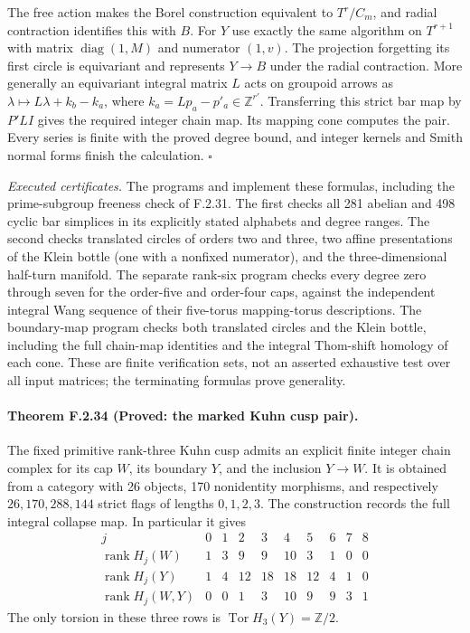 The free action makes the Borel construction equivalent to
$T^r/C_m$, and radial contraction identifies this with $B$.
For $Y$ use exactly the same algorithm on $T^{r+1}$ with
matrix $\operatorname{diag}(1,M)$ and numerator $(1,v)$.
The projection forgetting its first circle is equivariant and
represents $Y\to B$ under the radial contraction.
More generally an equivariant integral matrix $L$ acts on
groupoid arrows as
$\lambda\mapsto L\lambda+k_b-k_a$, where
$k_a=Lp_a-p'_a\in\mathbb Z^{r'}$.
Transferring this strict bar map by $P'LI$ gives the required
integer chain map.  Its mapping cone computes the pair.
Every series is finite with the proved degree bound, and
integer kernels and Smith normal forms finish the calculation.
\hfill$\square$

\emph{Executed certificates.}
The programs  and
 implement these
formulas, including the prime-subgroup freeness check of F.2.31.
The first checks all 281 abelian and 498 cyclic bar simplices
in its explicitly stated alphabets and degree ranges.
The second checks translated circles of orders two and three,
two affine presentations of the Klein bottle (one with a
nonfixed numerator), and the three-dimensional half-turn
manifold.  The separate rank-six program checks every degree
zero through seven for the order-five and order-four caps,
against the independent integral Wang sequence of their
five-torus mapping-torus descriptions.
The boundary-map program checks both translated circles and
the Klein bottle, including the full chain-map identities and
the integral Thom-shift homology of each cone.  These are
finite verification sets, not an asserted exhaustive test over
all input matrices; the terminating formulas prove generality.

\paragraph{Theorem F.2.34 (Proved: the marked Kuhn cusp pair).}
The fixed primitive rank-three Kuhn cusp admits an explicit
finite integer chain complex for its cap $W$, its boundary
$Y$, and the inclusion $Y\to W$.  It is obtained from a
category with 26 objects, 170 nonidentity morphisms, and
respectively $26,170,288,144$ strict flags of lengths
$0,1,2,3$.  The construction records the full integral
collapse map.  In particular it gives
\[
\begin{array}{c|rrrrrrrrr}
j&0&1&2&3&4&5&6&7&8\\\hline
\operatorname{rank}H_j(W)&1&3&9&9&10&3&1&0&0\\
\operatorname{rank}H_j(Y)&1&4&12&18&18&12&4&1&0\\
\operatorname{rank}H_j(W,Y)&0&0&1&3&10&9&9&3&1
\end{array}                                                \tag{F.CK1}
\]
The only torsion in these three rows is
$\operatorname{Tor}H_3(Y)=\mathbb Z/2$.


